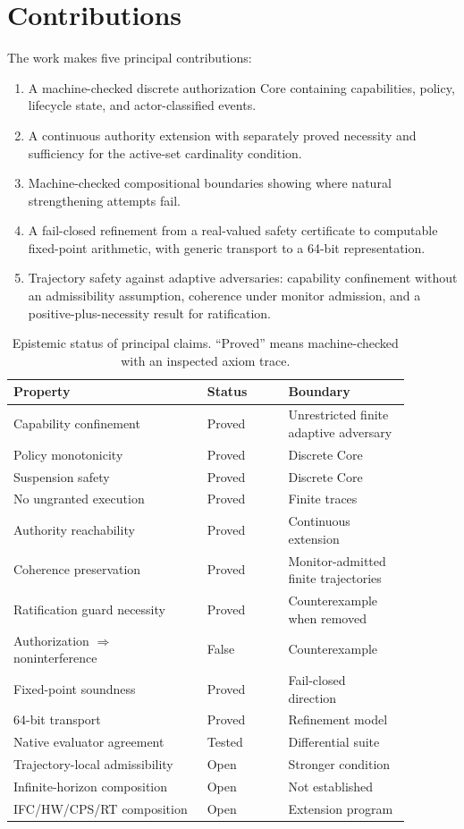\documentclass[11pt]{article}
\begin{document}
\section{Contributions}
The work makes five principal contributions:
\begin{enumerate}[leftmargin=*]
\item A machine-checked discrete authorization Core containing capabilities, policy, lifecycle state, and actor-classified events.
\item A continuous authority extension with separately proved necessity and sufficiency for the active-set cardinality condition.
\item Machine-checked compositional boundaries showing where natural strengthening attempts fail.
\item A fail-closed refinement from a real-valued safety certificate to computable fixed-point arithmetic, with generic transport to a 64-bit representation.
\item Trajectory safety against adaptive adversaries: capability confinement without an admissibility assumption, coherence under monitor admission, and a positive-plus-necessity result for ratification.
\end{enumerate}

\begin{table}[t]
\centering
\small
\begin{tabular}{p{0.43\linewidth}p{0.18\linewidth}p{0.27\linewidth}}
\toprule
Property & Status & Boundary\\
\midrule
Capability confinement & Proved & Unrestricted finite adaptive adversary\\
Policy monotonicity & Proved & Discrete Core\\
Suspension safety & Proved & Discrete Core\\
No ungranted execution & Proved & Finite traces\\
Authority reachability & Proved & Continuous extension\\
Coherence preservation & Proved & Monitor-admitted finite trajectories\\
Ratification guard necessity & Proved & Counterexample when removed\\
Authorization $\Rightarrow$ noninterference & False & Counterexample\\
Fixed-point soundness & Proved & Fail-closed direction\\
64-bit transport & Proved & Refinement model\\
Native evaluator agreement & Tested & Differential suite\\
Trajectory-local admissibility & Open & Stronger condition\\
Infinite-horizon composition & Open & Not established\\
IFC/HW/CPS/RT composition & Open & Extension program\\
\bottomrule
\end{tabular}
\caption{Epistemic status of principal claims. ``Proved'' means machine-checked with an inspected axiom trace.}
\end{table}
\end{document}
